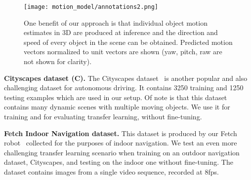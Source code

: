 \documentclass[letterpaper]{article} \usepackage{aaai19}  \usepackage{times}  \usepackage{helvet}  \usepackage{courier}  \usepackage{url}  \usepackage{graphicx}  \frenchspacing
\begin{document}
\begin{figure}
    \centering
    \texttt{[image: motion\_model/annotations2.png]}
    \caption{One benefit of our approach is that individual object motion estimates in 3D are produced at inference and the direction and speed of every object in the scene can be obtained. Predicted motion vectors normalized to unit vectors are shown (yaw, pitch, raw are not shown for clarity).}
\label{fig:kitti_vectors}
\end{figure}

\textbf{Cityscapes dataset (C).} The Cityscapes dataset~\cite{cordts2016cityscapes} is another popular and also challenging dataset for autonomous driving. It contains 3250 training and 1250 testing examples which are used in our setup. Of note is that this dataset contains many dynamic scenes with multiple moving objects. We use it for training and for evaluating transfer learning, without fine-tuning.

\begin{table*}
  \centering
  \caption{Depth prediction results when training on Cityscapes and evaluating on KITTI. Methods marked with an asterik (*) might use a different cropping as the exact parameters were not available.}
    \label{tab:main_city}
\end{table*}

\textbf{Fetch Indoor Navigation dataset.} This dataset is produced by our Fetch robot~\cite{wise2016fetch} collected for the purposes of indoor navigation. We test an even more challenging transfer learning scenario when training on an outdoor navigation dataset, Cityscapes, and testing on the indoor one without fine-tuning. The dataset contains  images from a single video sequence, recorded at 8fps.
\end{document}
